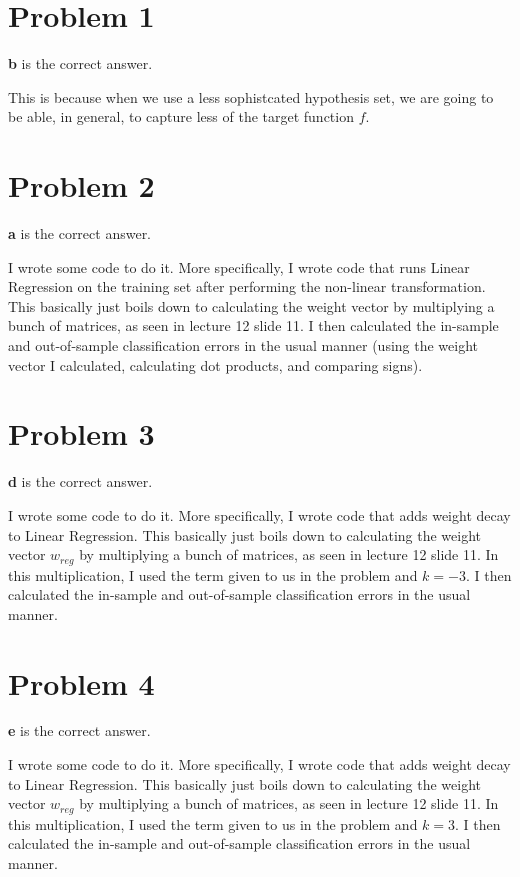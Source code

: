 \documentclass{article}
\begin{document}
\section*{Problem 1}
\textbf{b} is the correct answer.

\noindent This is because when we use a less sophistcated hypothesis set,
we are going to be able, in general, to capture less of the target function
$f$.

\section*{Problem 2}
\textbf{a} is the correct answer.

\noindent I wrote some code to do it. More specifically, I wrote code
that runs Linear Regression on the training set after performing the non-linear
transformation. This basically just boils down to calculating the weight vector
by multiplying a bunch of matrices, as seen in lecture 12 slide 11.
I then calculated the in-sample and out-of-sample classification
errors in the usual manner (using the weight vector I calculated, calculating
dot products, and comparing signs).

\section*{Problem 3}
\textbf{d} is the correct answer.

\noindent I wrote some code to do it. More specifically, I wrote code that
adds weight decay to Linear Regression. This basically just boils down to
calculating the weight vector $w_{reg}$ by multiplying a bunch of matrices,
as seen in lecture 12 slide 11. In this multiplication, I used the term
given to us in the problem and $k=-3$. I then calculated the in-sample and
out-of-sample classification errors in the usual manner.

\section*{Problem 4}
\textbf{e} is the correct answer.

\noindent I wrote some code to do it. More specifically, I wrote code that
adds weight decay to Linear Regression. This basically just boils down to
calculating the weight vector $w_{reg}$ by multiplying a bunch of matrices,
as seen in lecture 12 slide 11. In this multiplication, I used the term
given to us in the problem and $k=3$. I then calculated the in-sample and
out-of-sample classification errors in the usual manner.
\end{document}
